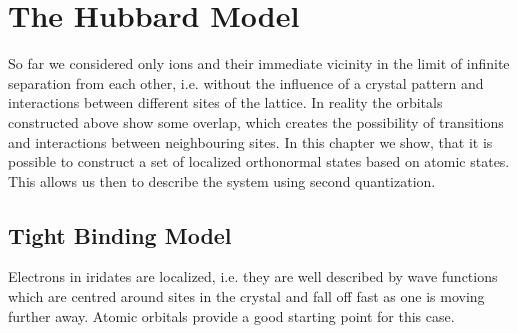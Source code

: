 
\newpage
\section{The Hubbard Model}

So far we considered only ions and their immediate vicinity in the limit of infinite separation from each other, 
i.e. without the influence of a crystal pattern and interactions between different sites of the lattice.
In reality the orbitals constructed above show some overlap, which creates the possibility of transitions and interactions between neighbouring sites.
In this chapter we show, that it is possible to construct a set of localized orthonormal states based on atomic states. 
This allows us then to describe the system using second quantization.


\subsection{Tight Binding Model} %

Electrons in iridates are localized, i.e. they are well described by wave functions
which are centred around sites in the crystal and fall off fast as one is moving further away. 
Atomic orbitals provide a good starting point for this case.


